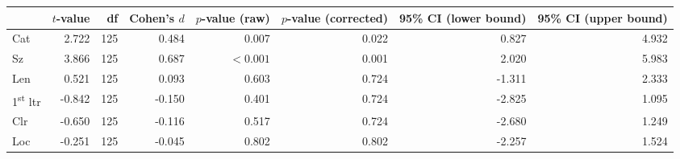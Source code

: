 \begin{tabular}{lrrrrrrr}
\toprule
{} & $t$-value &  df & Cohen's $d$ & $p$-value (raw) & $p$-value (corrected) & 95\% CI (lower bound) & 95\% CI (upper bound) \\
\midrule
Cat                       &     2.722 & 125 &       0.484 &           0.007 &                 0.022 &                 0.827 &                 4.932 \\
Sz                        &     3.866 & 125 &       0.687 &       $< 0.001$ &                 0.001 &                 2.020 &                 5.983 \\
Len                       &     0.521 & 125 &       0.093 &           0.603 &                 0.724 &                -1.311 &                 2.333 \\
1\textsuperscript{st} ltr &    -0.842 & 125 &      -0.150 &           0.401 &                 0.724 &                -2.825 &                 1.095 \\
Clr                       &    -0.650 & 125 &      -0.116 &           0.517 &                 0.724 &                -2.680 &                 1.249 \\
Loc                       &    -0.251 & 125 &      -0.045 &           0.802 &                 0.802 &                -2.257 &                 1.524 \\
\bottomrule
\end{tabular}
